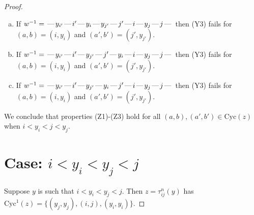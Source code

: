 \documentclass[10pt]{article}
\theoremstyle{definition}
\theoremstyle{definition}
\def\dash{\text{\hspace{0.5mm}---\hspace{0.5mm}}}
\def\Cyc{\mathrm{Cyc}}
\begin{document}
\begin{proof}
\begin{enumerate}
\begin{enumerate}[(a)]
\item If $w^{-1} = \dash y_{i'}\dash i'\dash y_i\dash y_{j'}\dash j'\dash i\dash y_j\dash j\dash $ then (Y3) fails for $(a,b)=(i,y_i)$ and $(a',b')=(j',y_{j'})$.
\item If $w^{-1} = \dash y_{i'}\dash i'\dash y_{j'}\dash j'\dash y_i\dash i\dash y_j\dash j\dash $ then (Y3) fails for $(a,b)=(i,y_i)$ and $(a',b')=(j',y_{j'})$.
\item If $w^{-1} = \dash y_{i'}\dash i'\dash y_{j'}\dash y_i\dash j'\dash i\dash y_j\dash j\dash $ then (Y3) fails for $(a,b)=(i,y_i)$ and $(a',b')=(j',y_{j'})$.
\end{enumerate}
\end{enumerate}
We conclude that properties (Z1)-(Z3) hold for all 
$(a,b),(a',b') \in \Cyc(z)$ when $i < y_i < j < y_j$.
\section{Case: $i < y_i < y_j < j$}
Suppose $y$ is such that $i < y_i < y_j < j$.
Then $z = \tau^n_{ij}(y)$ has $\Cyc^1(z) = \{(y_j,y_j),(i,j),(y_i,y_i)\}.$

\end{proof}
\end{document}
